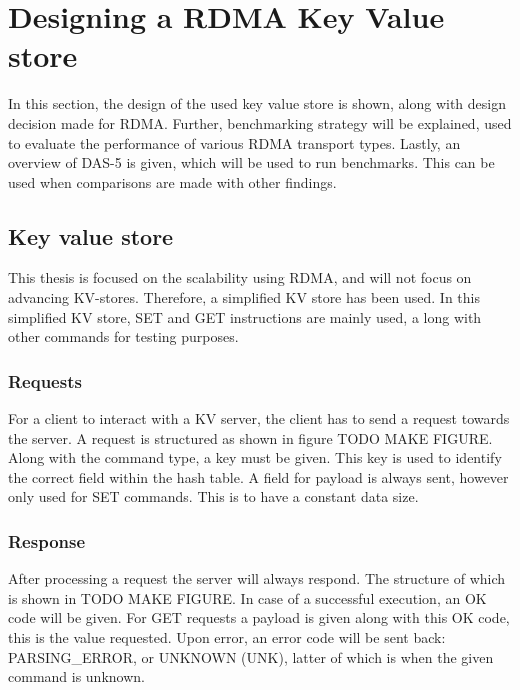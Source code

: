 
\chapter{Designing a RDMA Key Value store}\label{ch:design} %



\ifpdf
    \graphicspath{{7/figures/PNG/}{7/figures/PDF/}{7/figures/}}
\else
    \graphicspath{{7/figures/EPS/}{7/figures/}}
\fi


In this section, the design of the used key value store is shown, along with design decision made for RDMA.
Further, benchmarking strategy will be explained, used to evaluate the performance of various RDMA transport types.
Lastly, an overview of DAS-5 is given, which will be used to run benchmarks.
This can be used when comparisons are made with other findings.

\section{Key value store}
This thesis is focused on the scalability using RDMA, and will not focus on advancing KV-stores.
Therefore, a simplified KV store has been used.
In this simplified KV store, SET and GET instructions are mainly used, a long with other commands for testing purposes.

\subsection{Requests}
For a client to interact with a KV server, the client has to send a request towards the server.
A request is structured as shown in figure TODO MAKE FIGURE.
Along with the command type, a key must be given.
This key is used to identify the correct field within the hash table.
A field for payload is always sent, however only used for SET commands.
This is to have a constant data size.

\subsection{Response}
After processing a request the server will always respond.
The structure of which is shown in TODO MAKE FIGURE.
In case of a successful execution, an OK code will be given.
For GET requests a payload is given along with this OK code, this is the value requested.
Upon error, an error code will be sent back: PARSING\_ERROR, or UNKNOWN (UNK), latter of which is when the given command is unknown.


